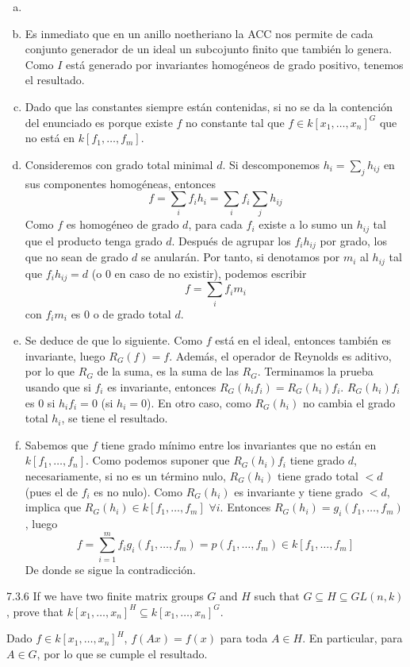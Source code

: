 \documentclass[twoside]{article}
\begin{document}
\begin{solucion}
\begin{enumerate}[a.]
\item[]
\item Es inmediato que en un anillo noetheriano la ACC nos permite de cada conjunto generador de un ideal un subcojunto finito que también lo genera. Como $I$ está generado por invariantes homogéneos de grado positivo, tenemos el resultado.
\item Dado que las constantes siempre están contenidas, si no se da la contención del enunciado es porque existe $f$ no constante tal que $f\in k[x_1,\dotsc,x_n]^G$ que no está en $k[f_1,\dotsc,f_m]$.
\item Consideremos con grado total minimal $d$. Si descomponemos $h_i = \sum_{j} h_{ij}$ en sus componentes homogéneas, entonces
$$
f = \sum_i f_i h_i = \sum_i f_i \sum_j  h_{ij}
$$
Como $f$ es homogéneo de grado $d$, para cada $f_i$ existe a lo sumo un $h_{ij}$ tal que el producto tenga grado $d$. Después de agrupar los $f_i h_{ij}$ por grado, los que no sean de grado $d$ se anularán. Por tanto, si denotamos por $m_i$ al $h_{ij}$ tal que $f_i h_{ij}=d$ (o $0$ en caso de no existir), podemos escribir
$$
f = \sum_i f_i m_i 
$$
con $f_i m_i$ es $0$ o de grado total $d$.

\item Se deduce de que lo siguiente. Como $f$ está en el ideal, entonces también es invariante, luego $R_G(f)=f$. Además, el operador de Reynolds es aditivo, por lo que $R_G$ de la suma, es la suma de las $R_G$. Terminamos la prueba usando que si $f_i$ es invariante, entonces $R_G(h_if_i)=R_G(h_i)f_i$. $R_G(h_i)f_i$ es $0$ si $h_i f_i = 0$ (si $h_i = 0$). En otro caso, como $R_G(h_i)$ no cambia el grado total $h_i$, se tiene el resultado.
\item Sabemos que $f$ tiene grado mínimo entre los invariantes que no están en $k[f_1,\dotsc,f_n]$. Como podemos suponer que $R_G(h_i)f_i$ tiene grado $d$, necesariamente, si no es un término nulo, $R_G(h_i)$ tiene grado total $<d$ (pues el de $f_i$ es no nulo). Como $R_G(h_i)$ es invariante y tiene grado $<d$, implica que $R_G(h_i)\in k[f_1,\dotsc,f_m]$ $\forall i$. Entonces $R_G(h_i) = g_i(f_1,\dotsc,f_m)$, luego
$$
f = \sum_{i=1}^m f_i g_i(f_1,\dotsc,f_m) = p(f_1,\dotsc,f_m) \in k[f_1,\dotsc,f_m]
$$
De donde se sigue la contradicción.
\end{enumerate}
\end{solucion}
\newpage

\begin{ejercicio}{7.3.6}
If we have two finite matrix groups $G$ and $H$ such that $G ⊆ H ⊆ GL(n, k)$, prove that
$k[x_1, \dots , x_n]^H ⊆ k[x_1, \dots , x_n]^G$.
\end{ejercicio}
\begin{solucion}
Dado $f\in k[x_1, \dots , x_n]^H$, $f(Ax)=f(x)$ para toda $A\in H$. En particular, para $A\in G$, por lo que se cumple el resultado.
\end{solucion}
\newpage
\end{document}
